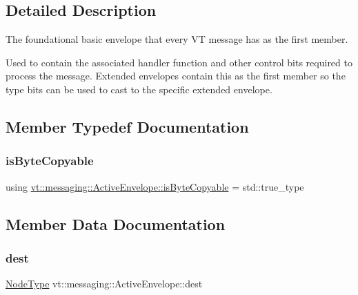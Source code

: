 \subsection{Detailed Description}
The foundational basic envelope that every VT message has as the first member. 

Used to contain the associated handler function and other control bits required to process the message. Extended envelopes contain this as the first member so the type bits can be used to cast to the specific extended envelope. 

\subsection{Member Typedef Documentation}
\mbox{\label{structvt_1_1messaging_1_1_active_envelope_ad9d4a03838736cf7240bd25bc317fd3c}} 
\subsubsection{\texorpdfstring{is\+Byte\+Copyable}{isByteCopyable}}
{\footnotesize\ttfamily using \hyperlink{structvt_1_1messaging_1_1_active_envelope_ad9d4a03838736cf7240bd25bc317fd3c}{vt\+::messaging\+::\+Active\+Envelope\+::is\+Byte\+Copyable} =  std\+::true\+\_\+type}



\subsection{Member Data Documentation}
\mbox{\label{structvt_1_1messaging_1_1_active_envelope_ad82d63430ef2ae4d03c1a986fa2f9350}} 
\subsubsection{\texorpdfstring{dest}{dest}}
{\footnotesize\ttfamily \hyperlink{namespacevt_a866da9d0efc19c0a1ce79e9e492f47e2}{Node\+Type} vt\+::messaging\+::\+Active\+Envelope\+::dest}



